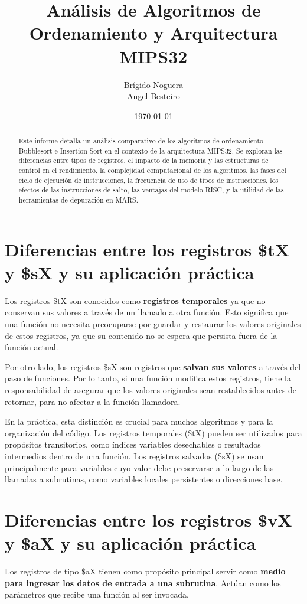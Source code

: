 \documentclass{article}
\author{Brígido Noguera \\ Angel Besteiro}
\title{Análisis de Algoritmos de Ordenamiento y Arquitectura MIPS32}
\date{\today}
\begin{document}
\maketitle

\begin{abstract}
Este informe detalla un análisis comparativo de los algoritmos de ordenamiento Bubblesort e Insertion Sort en el contexto de la arquitectura MIPS32. Se exploran las diferencias entre tipos de registros, el impacto de la memoria y las estructuras de control en el rendimiento, la complejidad computacional de los algoritmos, las fases del ciclo de ejecución de instrucciones, la frecuencia de uso de tipos de instrucciones, los efectos de las instrucciones de salto, las ventajas del modelo RISC, y la utilidad de las herramientas de depuración en MARS.
\end{abstract}

\tableofcontents
\newpage

\section{Diferencias entre los registros \$tX y \$sX y su aplicación práctica}
Los registros \$tX son conocidos como \textbf{registros temporales} ya que no conservan sus valores a través de un llamado a otra función. Esto significa que una función no necesita preocuparse por guardar y restaurar los valores originales de estos registros, ya que su contenido no se espera que persista fuera de la función actual.

Por otro lado, los registros \$sX son registros que \textbf{salvan sus valores} a través del paso de funciones. Por lo tanto, si una función modifica estos registros, tiene la responsabilidad de asegurar que los valores originales sean restablecidos antes de retornar, para no afectar a la función llamadora.

En la práctica, esta distinción es crucial para muchos algoritmos y para la organización del código. Los registros temporales (\$tX) pueden ser utilizados para propósitos transitorios, como índices variables desechables o resultados intermedios dentro de una función. Los registros salvados (\$sX) se usan principalmente para variables cuyo valor debe preservarse a lo largo de las llamadas a subrutinas, como variables locales persistentes o direcciones base.

\section{Diferencias entre los registros \$vX y \$aX y su aplicación práctica}
Los registros de tipo \$aX tienen como propósito principal servir como \textbf{medio para ingresar los datos de entrada a una subrutina}. Actúan como los parámetros que recibe una función al ser invocada.
\end{document}
